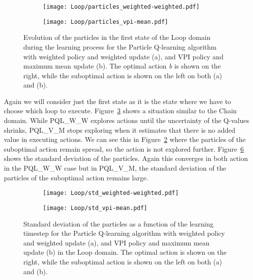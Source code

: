 \begin{figure}
\centering
\begin{subfigure}{\linewidth}
  \centering
  \texttt{[image: Loop/particles\_weighted-weighted.pdf]}
  \label{fig:loop_particles_weighted_weighted}
  \caption{}
\end{subfigure}%

\bigskip
\centering
\begin{subfigure}{\linewidth}
  \centering
  \texttt{[image: Loop/particles\_vpi-mean.pdf]}
  \caption{}
  \label{fig:loop_particles_vpi_mean}
\end{subfigure}
\caption{Evolution of the particles in the first state of the Loop domain during the learning process for the Particle Q-learning algorithm with weighted policy and weighted update (a), and VPI policy and maximum mean update (b). The optimal action \emph{b} is shown on the right, while the suboptimal action is shown on the left on both (a) and (b).}
\label{fig:loop_particle_evolution}
\end{figure}
Again we will consider just the first state as it is the state where we have to choose which loop to execute. Figure~\ref{fig:loop_particle_evolution} shows a situation similar to the Chain domain. While PQL\_W\_W explores actions until the uncertainty of the Q-values shrinks, PQL\_V\_M stops exploring when it estimates that there is no added value in executing actions. We can see this in Figure~\ref{fig:loop_particles_vpi_mean} where the particles of the suboptimal action remain spread, so the action is not explored further. Figure~\ref{fig:loop_std_evolution} shows the standard deviation of the particles. Again this converges in both action in the PQL\_W\_W case but in PQL\_V\_M, the standard deviation of the particles of the suboptimal action remains large.\par
\begin{figure}
\centering
\begin{subfigure}{\linewidth}
  \centering
  \texttt{[image: Loop/std\_weighted-weighted.pdf]}
  \label{fig:loop_std_weighted_weighted}
  \caption{}
\end{subfigure}

\bigskip
\centering
\begin{subfigure}{\linewidth}
  \centering
  \texttt{[image: Loop/std\_vpi-mean.pdf]}
  \label{fig:loop_std_vpi_mean}
  \caption{}
\end{subfigure}
\caption{Standard deviation of the particles as a function of the learning timestep for the Particle Q-learning algorithm with weighted policy and weighted update (a), and VPI policy and maximum mean update (b) in the Loop domain. The optimal action  is shown on the right, while the suboptimal action is shown on the left on both (a) and (b).}
\label{fig:loop_std_evolution}
\end{figure}
